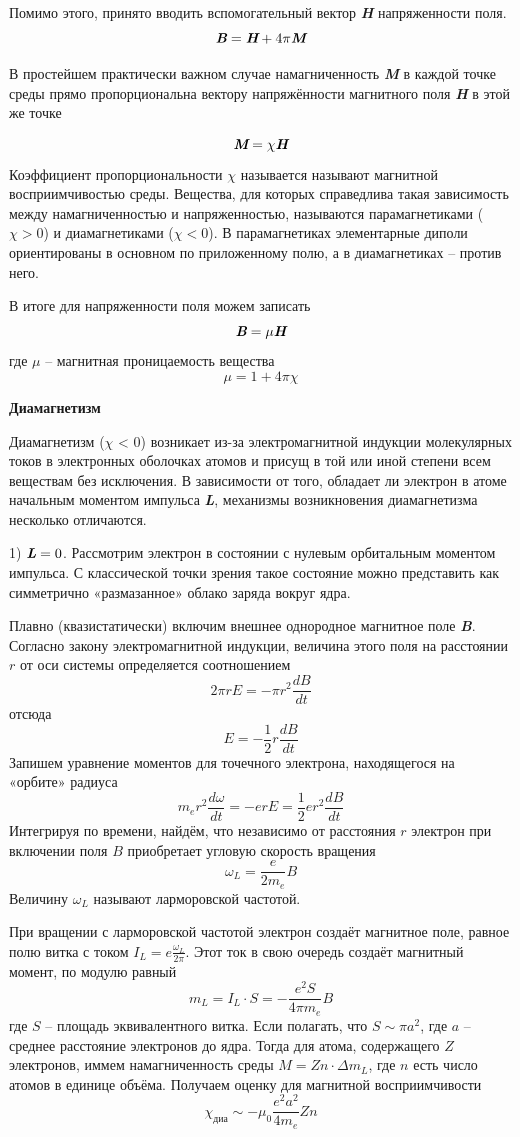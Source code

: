 \documentclass[a4paper,12pt]{article}
\begin{document}
 Помимо этого, принято вводить вспомогательный вектор \textit{\textbf{H}} напряженности поля.
\[\textit{\textbf{B}} = \textit{\textbf{H}} + 4\pi \textit{\textbf{M}}\]

В простейшем практически важном случае намагниченность \textit{\textbf{M}} в каждой точке среды прямо пропорциональна вектору напряжённости магнитного поля \textit{\textbf{H}} в этой же точке

\[\textit{\textbf{M}} = \chi \textit{\textbf{H}}\]
Коэффициент пропорциональности $\chi$ называется называют магнитной восприимчивостью среды. Вещества, для которых справедлива такая зависимость между намагниченностью и напряженностью, называются парамагнетиками ($\chi > 0$) и диамагнетиками ($\chi < 0$). В парамагнетиках элементарные диполи ориентированы в основном по приложенному полю, а в диамагнетиках -- против него.

В итоге для напряженности поля можем записать
\[\textit{\textbf{B}} = \mu\textit{\textbf{H}}\]
где $\mu$ -- магнитная проницаемость вещества
\[\mu = 1 + 4\pi \chi\]

\textbf{Диамагнетизм}

Диамагнетизм ($\chi$ < 0) возникает из-за электромагнитной индукции
молекулярных токов в электронных оболочках атомов и присущ в той
или иной степени всем веществам без исключения. В зависимости от
того, обладает ли электрон в атоме начальным моментом импульса \textit{\textbf{L}},
механизмы возникновения диамагнетизма несколько отличаются.

1) $\textit{\textbf{L}} = 0$. Рассмотрим электрон в состоянии с нулевым орбитальным моментом импульса. С классической точки зрения такое состояние можно представить как симметрично «размазанное» облако заряда вокруг ядра.

Плавно (квазистатически) включим внешнее однородное магнитное поле \textit{\textbf{B}}.  Согласно закону электромагнитной индукции, величина
этого поля на расстоянии $r$ от оси системы определяется соотношением
\[2\pi r E = -\pi r^2 \frac{dB}{dt}\]
отсюда 
\[E = -\frac{1}{2} r \frac{dB}{dt}\]
Запишем уравнение моментов для точечного электрона, находящегося
на «орбите» радиуса 
\[m_e r^2 \frac{d\omega}{dt} = -e r E = \frac{1}{2} e r^2 \frac{dB}{dt}\]
Интегрируя по времени, найдём, что независимо от расстояния $r$
электрон при включении поля $B$ приобретает угловую скорость вращения
\[\omega_L = \frac{e}{2m_e} B\]
Величину $\omega_L$ называют ларморовской частотой.

При вращении с ларморовской частотой электрон создаёт магнитное поле, равное полю витка с током $I_L = e  \frac{\omega_L}{2\pi}$. Этот ток в свою очередь
создаёт магнитный момент, по модулю равный
\[m_L = I_L \cdot S = -\frac{e^2 S}{4\pi m_e}B\]
где $S$ -- площадь эквивалентного витка. Если полагать, что $S \sim \pi a^2$, где $a$ -- среднее расстояние электронов до ядра. Тогда для атома, содержащего $Z$ электронов, иммем намагниченность среды $M = Z n \cdot \Delta m_L$, где $n$ есть число атомов в единице объёма. Получаем оценку для магнитной восприимчивости
\[\chi_{диа} \sim -\mu_0\frac{e^2 a^2}{4 m_e} Z n\]
\end{document}
